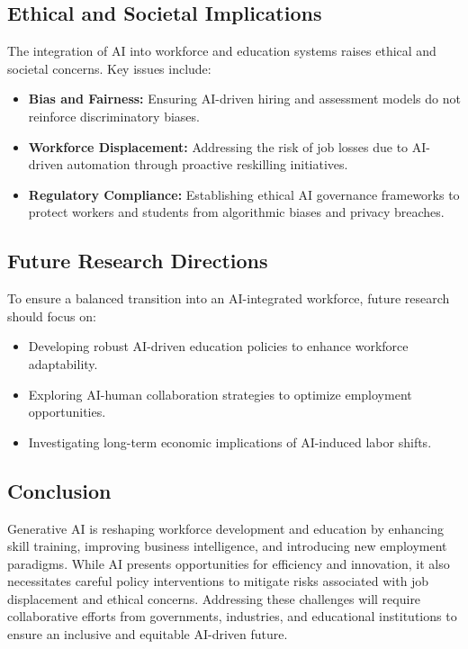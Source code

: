 \documentclass[a4paper,headinclude=on,footinclude=on,12pt,oneside]{scrbook}
\begin{document}
\subsection*{Ethical and Societal Implications}

The integration of AI into workforce and education systems raises ethical and societal concerns. Key issues include:
\begin{itemize}
	\item \textbf{Bias and Fairness:} Ensuring AI-driven hiring and assessment models do not reinforce discriminatory biases.
	\item \textbf{Workforce Displacement:} Addressing the risk of job losses due to AI-driven automation through proactive reskilling initiatives.
	\item \textbf{Regulatory Compliance:} Establishing ethical AI governance frameworks to protect workers and students from algorithmic biases and privacy breaches.
\end{itemize}

\subsection*{Future Research Directions}

To ensure a balanced transition into an AI-integrated workforce, future research should focus on:
\begin{itemize}
	\item Developing robust AI-driven education policies to enhance workforce adaptability.
	\item Exploring AI-human collaboration strategies to optimize employment opportunities.
	\item Investigating long-term economic implications of AI-induced labor shifts.
\end{itemize}

\subsection*{Conclusion}

Generative AI is reshaping workforce development and education by enhancing skill training, improving business intelligence, and introducing new employment paradigms. While AI presents opportunities for efficiency and innovation, it also necessitates careful policy interventions to mitigate risks associated with job displacement and ethical concerns. Addressing these challenges will require collaborative efforts from governments, industries, and educational institutions to ensure an inclusive and equitable AI-driven future.
\end{document}
